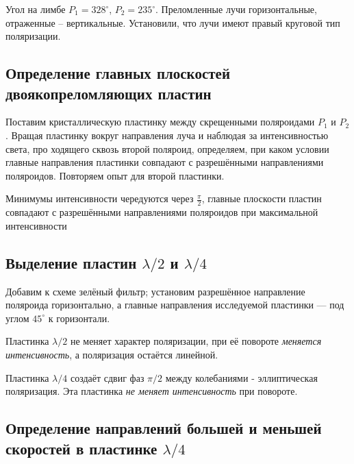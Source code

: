 \documentclass[15pt,a5paper,reqno]{article}
\begin{document}
Угол на лимбе $P_1 = 328^{\circ}$, $P_2 = 235^{\circ}$. Преломленные лучи горизонтальные, отраженные – вертикальные. Установили, что лучи имеют правый
круговой тип поляризации. 

\subsection{Определение главных плоскостей двоякопреломляющих пластин}
Поставим кристаллическую пластинку
между скрещенными поляроидами $P_1$ и $P_2$. Вращая пластинку вокруг направления луча
и наблюдая за интенсивностью света, про
ходящего сквозь второй поляроид, определяем, при
каком условии главные направления пластинки
совпадают с разрешёнными направлениями поляроидов. Повторяем опыт для второй пластинки.

Минимумы интенсивности чередуются через $\frac{\pi}{2}$, главные плоскости пластин совпадают с разрешёнными направлениями поляроидов при максимальной интенсивности

\subsection{Выделение пластин $\lambda/2$ и $\lambda/4$}
Добавим к схеме зелёный фильтр; установим
разрешённое направление поляроида горизонтально, а главные направления исследуемой пластинки — под углом $45^{\circ}$ к горизонтали. 
\par Пластинка $\lambda/2$ не меняет характер поляризации, при её повороте \textit{меняется интенсивность}, а поляризация остаётся линейной. 
\par Пластинка $\lambda/4$ создаёт сдвиг фаз $\pi/2$ между колебаниями - эллиптическая поляризация. Эта пластинка \textit{не меняет интенсивность} при повороте.

\subsection{Определение направлений большей и меньшей скоростей в пластинке $\lambda/4$}
\end{document}
